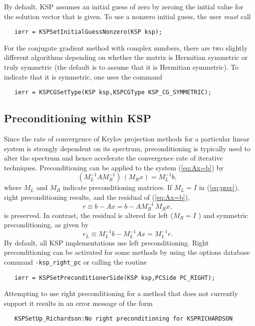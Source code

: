By default, KSP assumes an initial guess of zero by zeroing the initial 
value for the solution vector that is given. To use a nonzero 
initial guess, the user {\em must} call 
\begin{verbatim}
   ierr = KSPSetInitialGuessNonzero(KSP ksp);
\end{verbatim}

For the conjugate gradient method with complex numbers, there are two
slightly different algorithms depending on whether the matrix is 
Hermitian symmetric or truly symmetric (the default is to assume that
it is Hermitian symmetric). To indicate that it is symmetric, one uses the command
  
\begin{verbatim}
   ierr = KSPCGSetType(KSP ksp,KSPCGType KSP_CG_SYMMETRIC);
\end{verbatim}

\subsection{Preconditioning within KSP} 
\label{sec:ksppc}

Since the rate of convergence of Krylov projection methods for a
particular linear system is strongly dependent on its spectrum,
preconditioning is typically used to alter the spectrum and hence
accelerate the convergence rate of iterative techniques.
Preconditioning can be applied to the system (\ref{eq:Ax=b}) by
\begin{equation}
   (M_L^{-1} A M_R^{-1}) \, (M_R x) = M_L^{-1} b,
\label{eq:prec}
\end{equation}
where $ M_L$ and $ M_R $ indicate preconditioning matrices.  If $ M_L = I $
in (\ref{eq:prec}), right preconditioning results, and the
residual of (\ref{eq:Ax=b}),
  \[ r \equiv b - Ax = b - A M_R^{-1} \, M_R x, \]
is preserved.  In contrast, the residual is altered for left 
($ M_R = I $ ) and symmetric preconditioning, as given by
  \[ r_L \equiv M_L^{-1} b - M_L^{-1} A x = M_L^{-1} r. \]
By default, all KSP implementations use left preconditioning.  
Right preconditioning can be activated for some methods by
using the options database command {\tt -ksp\_right\_pc} or
calling the routine  
\begin{verbatim}
   ierr = KSPSetPreconditionerSide(KSP ksp,PCSide PC_RIGHT);
\end{verbatim}
Attempting to use right preconditioning for a method that
does not currently support it results in an error message of the form
\begin{verbatim}
   KSPSetUp_Richardson:No right preconditioning for KSPRICHARDSON
\end{verbatim}

